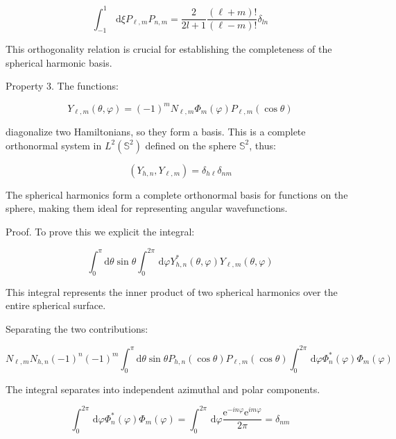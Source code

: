 \begin{equation}
\int_{-1}^{1} \, \mathrm{d} \xi P_{\ell, m} P_{n, m}=\frac{2}{2 l+1} \frac{(\ell+m)!}{(\ell-m)!} \delta_{l n}
\end{equation}

This orthogonality relation is crucial for establishing the completeness of the spherical harmonic basis.

Property 3. The functions:

\begin{equation}
Y_{\ell, m}(\theta, \varphi)=(-1)^{m} N_{\ell, m} \Phi_{m}(\varphi) P_{\ell, m}(\cos \theta)
\end{equation}

diagonalize two Hamiltonians, so they form a basis. This is a complete orthonormal system in $L^{2}\left(\mathbb{S}^{2}\right)$ defined on the sphere $\mathbb{S}^{2}$, thus:

\begin{equation}
\left(Y_{h, n}, Y_{\ell, m}\right)=\delta_{h \ell} \delta_{n m}
\end{equation}

The spherical harmonics form a complete orthonormal basis for functions on the sphere, making them ideal for representing angular wavefunctions.

Proof. To prove this we explicit the integral:

\begin{equation}
\int_{0}^{\pi} \mathrm{d} \theta \sin \theta \int_{0}^{2 \pi} \, \mathrm{d} \varphi Y_{h, n}^{*}(\theta, \varphi) Y_{\ell, m}(\theta, \varphi)
\end{equation}

This integral represents the inner product of two spherical harmonics over the entire spherical surface.

Separating the two contributions:

\begin{equation}
N_{\ell, m} N_{h, n}(-1)^{n}(-1)^{m} \int_{0}^{\pi} \mathrm{d} \theta \sin \theta P_{h, n}(\cos \theta) P_{\ell, m}(\cos \theta) \int_{0}^{2 \pi} \, \mathrm{d} \varphi \Phi_{n}^{*}(\varphi) \Phi_{m}(\varphi)
\end{equation}

The integral separates into independent azimuthal and polar components.

\begin{equation}
\int_{0}^{2 \pi} \, \mathrm{d} \varphi \Phi_{n}^{*}(\varphi) \Phi_{m}(\varphi)=\int_{0}^{2 \pi} \, \mathrm{d} \varphi \frac{\mathrm{e}^{-i n \varphi} \mathrm{e}^{i m \varphi}}{2 \pi}=\delta_{n m}
\end{equation}

